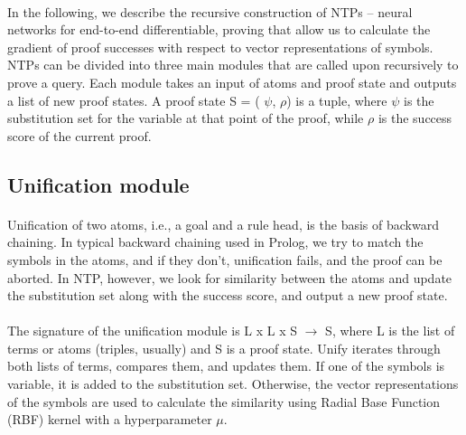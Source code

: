 \documentclass[Other]{iitddiss}
\begin{document}
\paragraph{}
In the following, we describe the recursive construction of NTPs – neural networks for end-to-end differentiable, proving that allow us to calculate the gradient of proof successes with respect to vector representations of symbols. NTPs can be divided into three main modules that are called upon recursively to prove a query. Each module takes an input of atoms and proof state and outputs a list of new proof states.
A proof state S = ( {$\psi$}, {$\rho$}) is a tuple, where {$\psi$} is the substitution set for the variable at that point of the proof, while {$\rho$} is the success score of the current proof.

\subsection{Unification module}
\paragraph{}
Unification of two atoms, i.e., a goal and a rule head, is the basis of backward chaining. In typical backward chaining used in Prolog, we try to match the symbols in the atoms, and if they don't, unification fails, and the proof can be aborted. In NTP, however, we look for similarity between the atoms and update the substitution set along with the success score, and output a new proof state. 

\paragraph{}
The signature of the unification module is L x L x S $\rightarrow$ S, where L is the list of terms or atoms (triples, usually) and S is a proof state. Unify iterates through both lists of terms, compares them, and updates them. If one of the symbols is variable, it is added to the substitution set. Otherwise, the vector representations of the symbols are used to calculate the similarity using Radial Base Function (RBF) kernel with a hyperparameter $\mu$.
\end{document}
